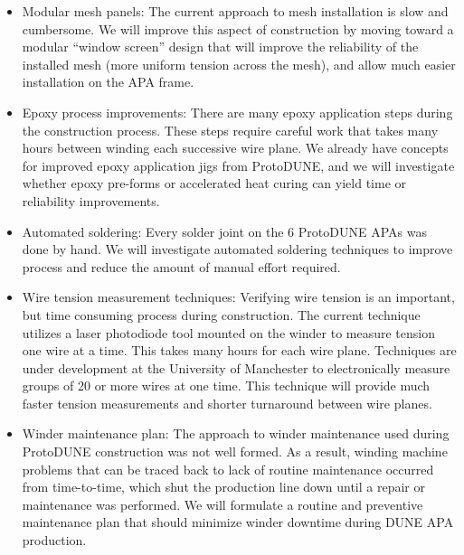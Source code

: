 \begin{itemize}
\begin{dunefigure}{fig:winding-dev}
{Work is ongoing to modify the wiring machine design to allow an APA frame to be rotated without removing it from the frame.  This would reduce the required handling of the frame during fabrication and speed production substantially.}
\texttt{[image: apa-winding-machine-design-development.jpg]} 
\end{dunefigure}

\item Modular mesh panels: The current approach to mesh installation is slow and cumbersome. We will improve this aspect of construction by moving toward a modular ``window screen'' design that will improve the reliability of the installed mesh (more uniform tension across the mesh), and allow much easier installation on the APA frame.

\item Epoxy process improvements: There are many epoxy application steps during the construction process. These steps require careful work that takes many hours between winding each successive wire plane. We already have concepts for improved epoxy application jigs from ProtoDUNE, and we will investigate whether epoxy pre-forms or accelerated heat curing can yield time or reliability improvements.

\item Automated soldering: Every solder joint on the 6 ProtoDUNE APAs was done by hand. We will investigate automated soldering techniques to improve process and reduce the amount of manual effort required. 

\item Wire tension measurement techniques: Verifying wire tension is an important, but time consuming process during construction. The current technique utilizes a laser photodiode tool mounted on the winder to measure tension one wire at a time. This takes many hours for each wire plane. Techniques are under development at the University of Manchester to electronically measure groups of 20 or more wires at one time. This technique will provide much faster tension measurements and shorter turnaround between wire planes. 

\item Winder maintenance plan: The approach to winder maintenance used during ProtoDUNE construction was not well formed. As a result, winding machine problems that can be traced back to lack of routine maintenance occurred from time-to-time, which shut the production line down until a repair or maintenance was performed. We will formulate a routine and preventive maintenance plan that should minimize winder downtime during DUNE APA production.
\end{itemize}


